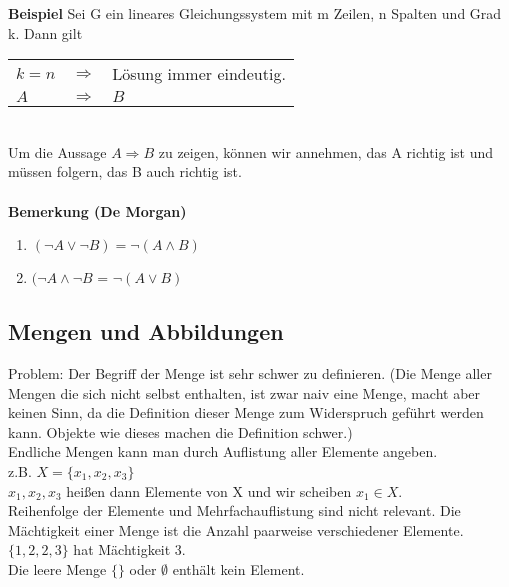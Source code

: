 \documentclass{scrartcl}
\begin{document}
\textbf{Beispiel} Sei G ein lineares Gleichungssystem mit m Zeilen, n Spalten und Grad k. Dann gilt \\
\begin{tabular}{l c l}
\(k = n\) & \(\Rightarrow\) & L\"osung immer eindeutig.\\
\(A\) & \(\Rightarrow\) &  \(B\)\\
\end{tabular}\\
Um die Aussage \(A \Rightarrow B\) zu zeigen, k\"onnen wir annehmen, das A richtig ist und m\"ussen folgern, das B auch richtig ist.\\
\\
\textbf{Bemerkung (De Morgan)}
\begin{enumerate}
\item{\((\neg A \lor \neg B) = \neg (A \land B)\)}
\item{\((\neg A \land \neg B\) = \(\neg (A \lor B)\)}
\end{enumerate}

\subsection{Mengen und Abbildungen}
Problem: Der Begriff der Menge ist sehr schwer zu definieren. (Die Menge aller Mengen die sich nicht selbst enthalten, ist zwar naiv eine Menge, macht aber keinen Sinn, da die Definition dieser Menge zum Widerspruch gef\"uhrt werden kann. Objekte wie dieses machen die Definition schwer.)\\
Endliche Mengen kann man durch Auflistung aller Elemente angeben.\\
z.B. \(X = \{x_1, x_2, x_3\}\)\\
\(x_1, x_2, x_3\) hei\ss{}en dann Elemente von X und wir scheiben \(x_1 \in X\).\\
Reihenfolge der Elemente und Mehrfachauflistung sind nicht relevant. Die M\"achtigkeit einer Menge ist die Anzahl paarweise verschiedener Elemente.\\
\(\{1, 2, 2, 3\}\) hat M\"achtigkeit 3.\\
Die leere Menge \(\{\}\) oder \(\emptyset\) enth\"alt kein Element.
\end{document}
